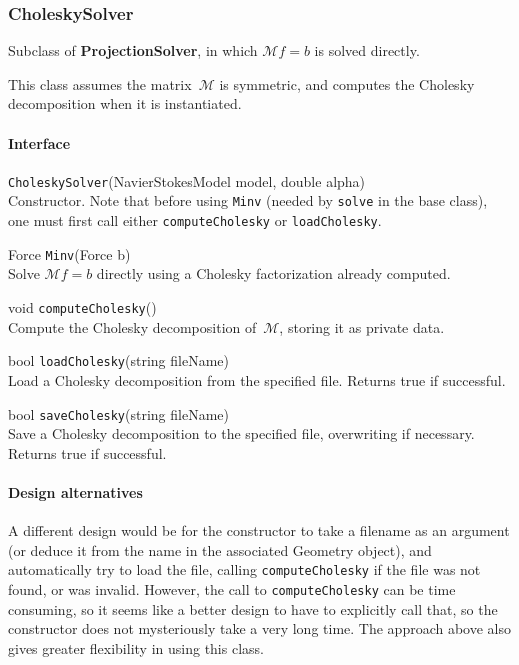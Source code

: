 \documentclass[11pt]{article}
\def\class#1{{\bf #1}} %
\def\fn#1{{\tt #1}} %
\begin{document}
\subsubsection{CholeskySolver}
Subclass of \class{ProjectionSolver}, in which $\mathcal{M}f=b$ is solved directly.

This class assumes the matrix~$\mathcal{M}$ is symmetric, and computes the Cholesky decomposition when it is instantiated.

\paragraph{Interface}
\begin{description}
	\item \fn{CholeskySolver}(NavierStokesModel model, double alpha)\\
		Constructor.  Note that before using \fn{Minv} (needed by \fn{solve} in the base class), one must first call either \fn{computeCholesky} or \fn{loadCholesky}.
	\item Force \fn{Minv}(Force b)\\
		Solve $\mathcal{M}f = b$ directly using a Cholesky factorization already computed.
	\item void \fn{computeCholesky}()\\
		Compute the Cholesky decomposition of~$\mathcal{M}$, storing it as private data.
	\item bool \fn{loadCholesky}(string fileName)\\
		Load a Cholesky decomposition from the specified file.  Returns true if successful.
	\item bool \fn{saveCholesky}(string fileName)\\
		Save a Cholesky decomposition to the specified file, overwriting if necessary.  Returns true if successful.
\end{description}

\paragraph{Design alternatives}
A different design would be for the constructor to take a filename as an argument (or deduce it from the name in the associated Geometry object), and automatically try to load the file, calling \fn{computeCholesky} if the file was not found, or was invalid.  However, the call to \fn{computeCholesky} can be time consuming, so it seems like a better design to have to explicitly call that, so the constructor does not mysteriously take a very long time.  The approach above also gives greater flexibility in using this class.
\end{document}
